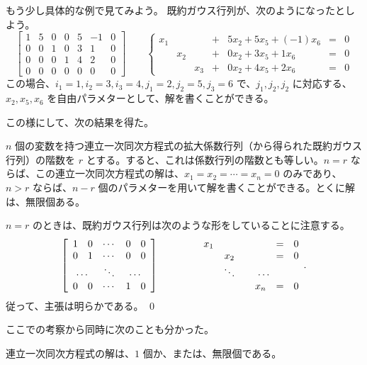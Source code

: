 \smallskip
もう少し具体的な例で見てみよう。
既約ガウス行列が、次のようになったとしよう。
$$\left[\begin{array}{ccccccc}
1 & 5 & 0 & 0 & 5 & -1 & 0\\
0 & 0 & 1 & 0 & 3 & 1 & 0\\
0 & 0 & 0 & 1 & 4 & 2 & 0\\
0 & 0 & 0 & 0 & 0 & 0 & 0
\end{array}\right] \qquad
\left\{\begin{array}{ccccccc}
x_{1} & & & +  & 5x_2 + 5x_5 + (-1)x_6  & = & 0\\
 & x_{2} & & + & 0x_2 + 3x_5 + 1x_6  & = & 0\\
  & & x_3 & +  & 0x_2 + 4x_5 + 2x_6  & = & 0
\end{array}\right.$$
この場合、$i_1 = 1, i_2 = 3, i_3 = 4, j_1 = 2, j_2 = 5, j_3 = 6$ で、$j_1, j_2, j_2$  に対応する、$x_2, x_5, x_6$ を自由パラメターとして、解を書くことができる。

\medskip
この様にして、次の結果を得た。

\begin{thm}\label{thm:homog}
$n$  個の変数を持つ連立一次同次方程式の拡大係数行列（から得られた既約ガウス行列）の階数を $r$ とする。すると、これは係数行列の階数とも等しい。$n=r$ ならば、この連立一次同次方程式の解は、$x_1 = x_2 = \cdots = x_n = 0$ のみであり、$n>r$ ならば、$n-r$ 個のパラメターを用いて解を書くことができる。とくに解は、無限個ある。
\end{thm}
\proof
$n = r$ のときは、既約ガウス行列は次のような形をしていることに注意する。
$$\left[\begin{array}{ccccc}
1 & 0 & \cdots & 0 & 0\\
0 & 1 & \cdots & 0 & 0\\
\multicolumn{2}{c}{\cdots} & \ddots & \multicolumn{2}{c}{\cdots}\\
0 & 0 & \cdots & 1 & 0 
\end{array}\right]\qquad\qquad
\begin{array}{cccccc}
x_1 & & & & = & 0\\
 & x_2 & & & = & 0\\
 & \ddots & \multicolumn{3}{c}{\cdots}\\
& & &  x_n & = & 0
\end{array}.$$
従って、主張は明らかである。
\qed

\medskip
ここでの考察から同時に次のことも分かった。

\begin{cor}
連立一次同次方程式の解は、$1$ 個か、または、無限個である。
\end{cor}

